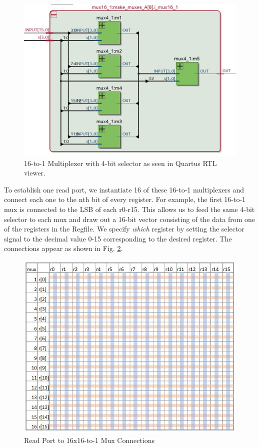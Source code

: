 \documentclass[conference]{IEEEtran}
\begin{document}
\begin{figure}[htbp]
    \centering
    \includegraphics[scale=0.3]{resources/figures/16-to-1-mux.JPG}
    \caption{16-to-1 Multiplexer with 4-bit selector as seen in Quartus RTL viewer.}
    \label{fig:16_to_1_mux}
\end{figure}
To establish one read port, we instantiate 16 of these 16-to-1 multiplexers and connect each one to the nth bit of every register. For example, the first 16-to-1 mux is connected to the LSB of each r0-r15. This allows us to feed the same 4-bit selector to each mux and draw out a 16-bit vector consisting of the data from one of the registers in the Regfile. We specify \textit{which} register by setting the selector signal to the decimal value 0-15 corresponding to the desired register. The connections appear as shown in Fig. \ref{fig:read_port_mux_connections}.

\begin{figure}[h]
    \centering
    \includegraphics[scale=0.50]{resources/figures/read_port_mux_connections.JPG}
    \caption{Read Port to 16x16-to-1 Mux Connections}
    \label{fig:read_port_mux_connections}
\end{figure}
\end{document}
